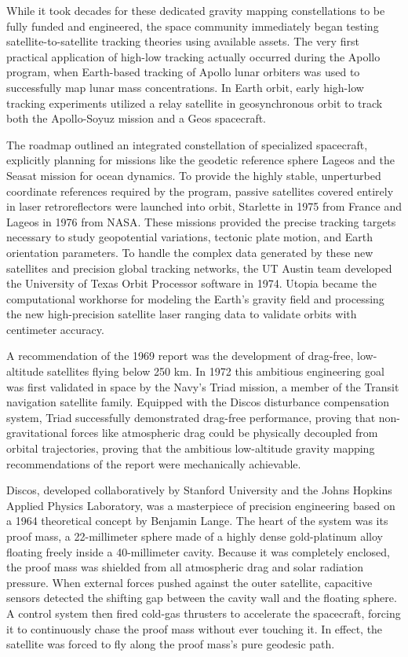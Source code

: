 While it took decades for these dedicated gravity mapping constellations to be fully funded and engineered, the space community immediately began testing satellite-to-satellite tracking theories using available assets. The very first practical application of high-low tracking actually occurred during the Apollo program, when Earth-based tracking of Apollo lunar orbiters was used to successfully map lunar mass concentrations. In Earth orbit, early high-low tracking experiments utilized a relay satellite in geosynchronous orbit to track both the Apollo-Soyuz mission and a Geos spacecraft. \cite{vetterFiftyYearsOrbit2007}

The roadmap outlined an integrated constellation of specialized spacecraft, explicitly planning for missions like the geodetic reference sphere Lageos and the Seasat mission for ocean dynamics. To provide the highly stable, unperturbed coordinate references required by the program, passive satellites covered entirely in laser retroreflectors were launched into orbit, Starlette in 1975 from France and Lageos in 1976 from NASA. These missions provided the precise tracking targets necessary to study geopotential variations, tectonic plate motion, and Earth orientation parameters. To handle the complex data generated by these new satellites and precision global tracking networks, the UT Austin team developed the University of Texas Orbit Processor software in 1974. Utopia became the computational workhorse for modeling the Earth’s gravity field and processing the new high-precision satellite laser ranging data to validate orbits with centimeter accuracy. \cite{langeDragFreeSatellite1964} \cite{staffSatelliteFreedAll1974}

A recommendation of the 1969 report was the development of drag-free, low-altitude satellites flying below 250 km. In 1972 this ambitious engineering goal was first validated in space by the Navy's Triad mission, a member of the Transit navigation satellite family. Equipped with the Discos disturbance compensation system, Triad successfully demonstrated drag-free performance, proving that non-gravitational forces like atmospheric drag could be physically decoupled from orbital trajectories, proving that the ambitious low-altitude gravity mapping recommendations of the report were mechanically achievable. \cite{debraDisturbanceCompensationSystem1973}

Discos, developed collaboratively by Stanford University and the Johns Hopkins Applied Physics Laboratory, was a masterpiece of precision engineering based on a 1964 theoretical concept by Benjamin Lange. The heart of the system was its proof mass, a 22-millimeter sphere made of a highly dense gold-platinum alloy floating freely inside a 40-millimeter cavity. Because it was completely enclosed, the proof mass was shielded from all atmospheric drag and solar radiation pressure. When external forces pushed against the outer satellite, capacitive sensors detected the shifting gap between the cavity wall and the floating sphere. A control system then fired cold-gas thrusters to accelerate the spacecraft, forcing it to continuously chase the proof mass without ever touching it. In effect, the satellite was forced to fly along the proof mass's pure geodesic path. \cite{langeDragFreeSatellite1964}

